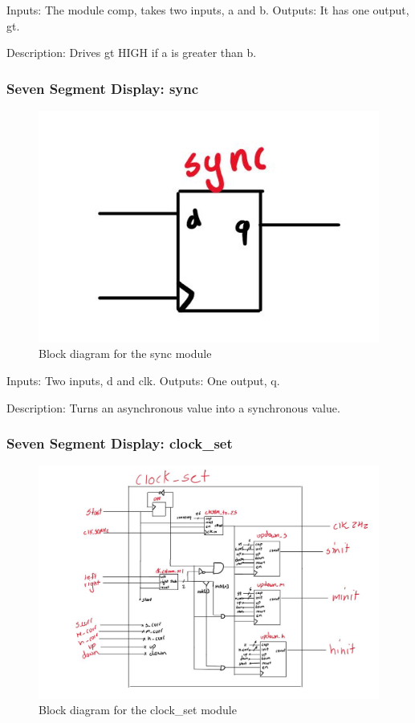 \documentclass[a4paper]{article}
\begin{document}
Inputs: The module comp, takes two inputs, a and b.
Outputs: It has one output, gt.

Description: Drives gt HIGH if a is greater than b.

\subsubsection{Seven Segment Display: sync}
\begin{figure}[H]
    \includegraphics[width=0.8 \linewidth]{images/sync.JPG}
    \caption{Block diagram for the sync module}
    \label{sync}
\end{figure}

Inputs: Two inputs, d and clk.
Outputs: One output, q.

Description: Turns an asynchronous value into a synchronous value.

\subsubsection{Seven Segment Display: clock_set}
\begin{figure}[H]
    \includegraphics[width=0.8 \linewidth]{images/clock_set.JPG}
    \caption{Block diagram for the clock_set module}
    \label{clock_set}
\end{figure}
\end{document}

